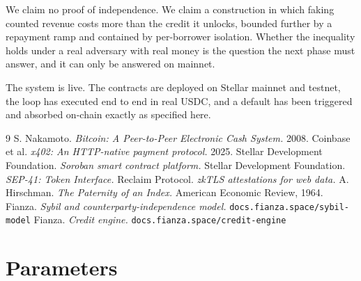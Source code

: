\documentclass[11pt,a4paper]{article}
\begin{document}
We claim no proof of independence. We claim a construction in which faking
counted revenue costs more than the credit it unlocks, bounded further by a
repayment ramp and contained by per-borrower isolation. Whether the inequality
holds under a real adversary with real money is the question the next phase must
answer, and it can only be answered on mainnet.

The system is live. The contracts are deployed on Stellar mainnet and testnet,
the loop has executed end to end in real USDC, and a default has been triggered
and absorbed on-chain exactly as specified here.

\begin{thebibliography}{9}
\setlength{\itemsep}{0.15em}
 S. Nakamoto. \emph{Bitcoin: A Peer-to-Peer Electronic Cash System.} 2008.
 Coinbase et al. \emph{x402: An HTTP-native payment protocol.} 2025.
 Stellar Development Foundation. \emph{Soroban smart contract platform.}
 Stellar Development Foundation. \emph{SEP-41: Token Interface.}
 Reclaim Protocol. \emph{zkTLS attestations for web data.}
 A. Hirschman. \emph{The Paternity of an Index.} American Economic Review, 1964.
 Fianza. \emph{Sybil and counterparty-independence model.} \texttt{docs.fianza.space/sybil-model}
 Fianza. \emph{Credit engine.} \texttt{docs.fianza.space/credit-engine}
\end{thebibliography}

\appendix

\section{Parameters}
\end{document}
